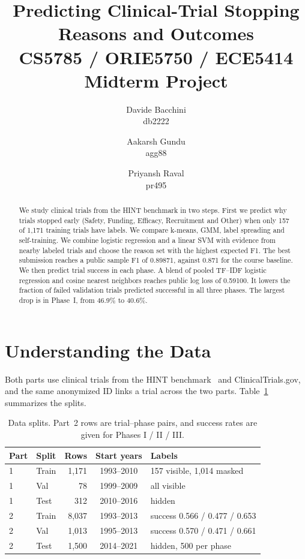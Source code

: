 \documentclass[10pt,twocolumn,letterpaper]{article}
\title{Predicting Clinical-Trial Stopping Reasons and Outcomes\\[0.4em]
{\normalsize\normalfont CS5785 / ORIE5750 / ECE5414 Midterm Project}}
\author{Davide Bacchini\\ db2222
\and Aakarsh Gundu\\ agg88
\and Priyansh Raval\\ pr495}
\begin{document}
\maketitle

\begin{abstract}
We study clinical trials from the HINT benchmark in two steps.
First we predict why trials stopped early (Safety, Funding, Efficacy, Recruitment and Other) when only 157 of 1{,}171 training trials have labels.
We compare k-means, GMM, label spreading and self-training. We combine logistic regression and a linear SVM with evidence from nearby labeled trials and choose the reason set with the highest expected F1. The best submission reaches a public sample F1 of 0.89871, against 0.871 for the course baseline.
We then predict trial success in each phase. A blend of pooled TF--IDF logistic regression and cosine nearest neighbors reaches public log loss of 0.59100. It lowers the fraction of failed validation trials predicted successful in all three phases. The largest drop is in Phase~I, from 46.9\% to 40.6\%.
\end{abstract}

\section{Understanding the Data}
Both parts use clinical trials from the HINT benchmark~\cite{fu2022hint} and ClinicalTrials.gov, and the same anonymized ID links a trial across the two parts. Table~\ref{tab:data} summarizes the splits.

\begin{table}[!b]
\centering
\footnotesize
\setlength{\tabcolsep}{3pt}
\begin{tabular}{llrcl}
\toprule
Part & Split & Rows & Start years & Labels \\
\midrule
1 & Train & 1{,}171 & 1993--2010 & 157 visible, 1{,}014 masked \\
1 & Val & 78 & 1999--2009 & all visible \\
1 & Test & 312 & 2010--2016 & hidden \\
2 & Train & 8{,}037 & 1993--2013 & success 0.566 / 0.477 / 0.653 \\
2 & Val & 1{,}013 & 1995--2013 & success 0.570 / 0.471 / 0.661 \\
2 & Test & 1{,}500 & 2014--2021 & hidden, 500 per phase \\
\bottomrule
\end{tabular}
\caption{Data splits. Part~2 rows are trial--phase pairs, and success rates are given for Phases I / II / III.}
\label{tab:data}
\end{table}
\end{document}
